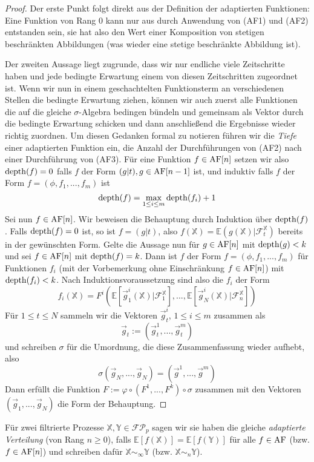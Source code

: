 \begin{proof}
Der erste Punkt folgt direkt aus der Definition der adaptierten Funktionen: Eine Funktion von Rang 0 kann nur aus durch Anwendung von (AF1) und (AF2) entstanden sein, sie hat also den Wert einer Komposition von stetigen beschränkten Abbildungen (was wieder eine stetige beschränkte Abbildung ist). 

Der zweiten Aussage liegt zugrunde, dass wir nur endliche viele Zeitschritte haben und jede bedingte Erwartung einem von diesen Zeitschritten zugeordnet ist. Wenn wir nun in einem geschachtelten Funktionsterm an verschiedenen Stellen die bedingte Erwartung ziehen, können wir auch zuerst alle Funktionen die auf die gleiche $\sigma$-Algebra bedingen bündeln und gemeinsam als Vektor durch die bedingte Erwartung schicken und dann anschließend die Ergebnisse wieder richtig zuordnen. Um diesen Gedanken formal zu notieren führen wir die \emph{Tiefe} einer adaptierten Funktion ein, die Anzahl der Durchführungen von (AF2) nach einer Durchführung von (AF3). Für eine Funktion $f \in \operatorname{AF}[n]$ setzen wir also $\operatorname{depth}(f)=0$ falls $f$ der Form $(g \vert t), g \in \operatorname{AF}[n-1]$ ist, und induktiv falls $f$ der Form $f=(\phi, f_1,...,f_m)$ ist
$$\operatorname{depth}(f) = \max_{1\leq i \leq m} \operatorname{depth}(f_i) + 1$$
Sei nun $f \in \operatorname{AF}[n]$. Wir beweisen die Behauptung durch Induktion über $\operatorname{depth}(f)$. Falls $\operatorname{depth}(f)=0$ ist, so ist $f = (g \vert t)$, also $f(\mathbb{X}) = \mathbb{E}(g(\mathbb{X})\vert \mathcal{F}_t^\mathbb{X})$ bereits in der gewünschten Form. Gelte die Aussage nun für $g \in \operatorname{AF}[n]$ mit $\operatorname{depth}(g) < k$ und sei $f\in\operatorname{AF}[n]$ mit $\operatorname{depth}(f)=k$. Dann ist $f$ der Form $f=(\phi, f_1,...,f_m)$ für Funktionen $f_i$ (mit der Vorbemerkung ohne Einschränkung $f \in \operatorname{AF}[n]$) mit $\operatorname{depth}(f_i)<k$. Nach Induktionsvoraussetzung sind also die $f_i$ der Form
$$f_i(\mathbb{X}) = F^i(\mathbb{E}[\vec{g}_1^i(\mathbb{X}) \vert \mathcal{F}_1^\mathbb{X}],...,\mathbb{E}[\vec{g}_N^i(\mathbb{X}) \vert \mathcal{F}_n^\mathbb{X}])$$
Für $1\leq t \leq N$ sammeln wir die Vektoren $\vec{g}_t^i$, $1 \leq i \leq m$ zusammen als
$$\vec{g}_t:=(\vec{g}_t^1,...,\vec{g}_t^m)$$
und schreiben $\sigma$ für die Umordnung, die diese Zusammenfassung wieder aufhebt, also
$$\sigma(\vec{g}_N,...,\vec{g}_N) = (\vec{g}^1,...,\vec{g}^m)$$
Dann erfüllt die Funktion $F := \varphi \circ (F^1,...,F^k) \circ \sigma$ zusammen mit den Vektoren $(\vec{g}_1,...,\vec{g}_N)$ die Form der Behauptung.
\end{proof}

\begin{definition}
Für zwei filtrierte Prozesse $\mathbb{X,Y} \in \mathcal{FP}_p$ sagen wir sie haben die gleiche \emph{adaptierte Verteilung} (von Rang $n\geq 0$), falls $\mathbb{E}[f(\mathbb{X})] = \mathbb{E}[f(\mathbb{Y})]$ für alle $f \in \operatorname{AF}$ (bzw. $f \in \operatorname{AF}[n]$) und schreiben dafür $\mathbb{X} \sim_\infty \mathbb{Y}$ (bzw. $\mathbb{X} \sim_n \mathbb{Y}$).
\end{definition}

